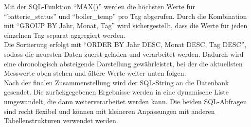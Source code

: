 \documentclass{article}
\begin{document}
    Mit der SQL-Funktion \enquote{MAX()} werden die höchsten Werte für \enquote{batterie\_status} und
    \enquote{boiler\_temp} pro Tag abgerufen.
    Durch die Kombination mit \enquote{GROUP BY Jahr, Monat, Tag} wird sichergestellt, dass die Werte für
    jeden einzelnen Tag separat aggregiert werden. \\
    Die Sortierung erfolgt mit \enquote{ORDER BY Jahr DESC, Monat DESC, Tag DESC}, sodass die neuesten
    Daten zuerst geladen und verarbeitet werden.
    Dadurch wird eine chronologisch absteigende Darstellung gewährleistet, bei der die aktuellsten
    Messwerte oben stehen und ältere Werte weiter unten folgen. \\
    Nach der finalen Zusammenstellung wird der SQL-String an die Datenbank gesendet.
    Die zurückgegebenen Ergebnisse werden in eine dynamische Liste umgewandelt, die dann weiterverarbeitet werden kann.
    Die beiden SQL-Abfragen sind recht flexibel und können mit kleineren Anpassungen mit anderen
    Tabellenstrukturen verwendet werden.


    
    
\end{document}
